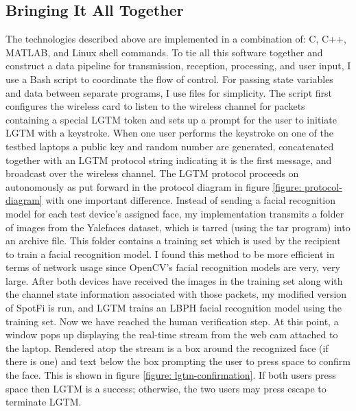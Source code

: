 \documentclass[12pt]{report}
\begin{document}
\subsection{Bringing It All Together}
The technologies described above are implemented in a combination of: C, C++, MATLAB, and Linux shell commands. To tie all this software together and construct a data pipeline for transmission, reception, processing, and user input, I use a Bash script to coordinate the flow of control. For passing state variables and data between separate programs, I use files for simplicity. The script first configures the wireless card to listen to the wireless channel for packets containing a special LGTM token and sets up a prompt for the user to initiate LGTM with a keystroke. When one user performs the keystroke on one of the testbed laptops a public key and random number are generated, concatenated together with an LGTM protocol string indicating it is the first message, and broadcast over the wireless channel. The LGTM protocol proceeds on autonomously as put forward in the protocol diagram in figure \ref{figure: protocol-diagram} with one important difference. Instead of sending a facial recognition model for each test device's assigned face, my implementation transmits a folder of images from the Yalefaces dataset, which is tarred (using the tar program) into an archive file. This folder contains a training set which is used by the recipient to train a facial recognition model. I found this method to be more efficient in terms of network usage since OpenCV's facial recognition models are very, very large. After both devices have received the images in the training set along with the channel state information associated with those packets, my modified version of SpotFi is run, and LGTM trains an LBPH facial recognition model using the training set. Now we have reached the human verification step. At this point, a window pops up displaying the real-time stream from the web cam attached to the laptop. Rendered atop the stream is a box around the recognized face (if there is one) and text below the box prompting the user to press space to confirm the face. This is shown in figure \ref{figure: lgtm-confirmation}. If both users press space then LGTM is a success; otherwise, the two users may press escape to terminate LGTM. \par
\end{document}

